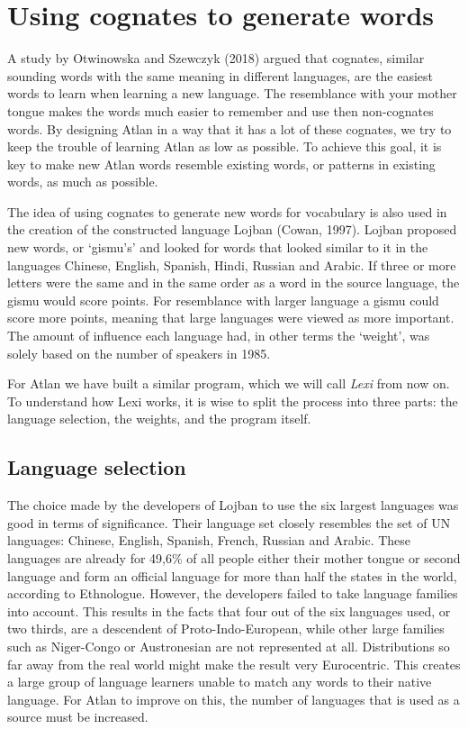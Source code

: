 \section{Using cognates to generate words}


A study by Otwinowska and Szewczyk (2018) argued that cognates, similar sounding words with the same meaning in different languages, are the easiest words to learn when learning a new language. The resemblance with your mother tongue makes the words much easier to remember and use then non-cognates words. By designing Atlan in a way that it has a lot of these cognates, we try to keep the trouble of learning Atlan as low as possible. To achieve this goal, it is key to make new Atlan words resemble existing words, or patterns in existing words, as much as possible. 

The idea of using cognates to generate new words for vocabulary is also used in the creation of the constructed language Lojban (Cowan, 1997).  Lojban proposed new words, or ‘gismu’s’ and looked for words that looked similar to it in the languages Chinese, English, Spanish, Hindi, Russian and Arabic. If three or more letters were the same and in the same order as a word in the source language, the gismu would score points. For resemblance with larger language a gismu could score more points, meaning that large languages were viewed as more important. The amount of influence each language had, in other terms the ‘weight’, was solely based on the number of speakers in 1985.  

For Atlan we have built a similar program, which we will call \textit{Lexi} from now on. To understand how Lexi works, it is wise to split the process into three parts: the language selection, the weights, and the program itself.  

\subsection{Language selection }

The choice made by the developers of Lojban to use the six largest languages was good in terms of significance. Their language set closely resembles the set of UN languages: Chinese, English, Spanish, French, Russian and Arabic. These languages are already for 49,6\% of all people either their mother tongue or second language and form an official language for more than half the states in the world, according to Ethnologue. However, the developers failed to take language families into account. This results in the facts that four out of the six languages used, or two thirds, are a descendent of Proto-Indo-European, while other large families such as Niger-Congo or Austronesian are not represented at all. Distributions so far away from the real world might make the result very Eurocentric. This creates a large group of language learners unable to match any words to their native language. For Atlan to improve on this, the number of languages that is used as a source must be increased. 

